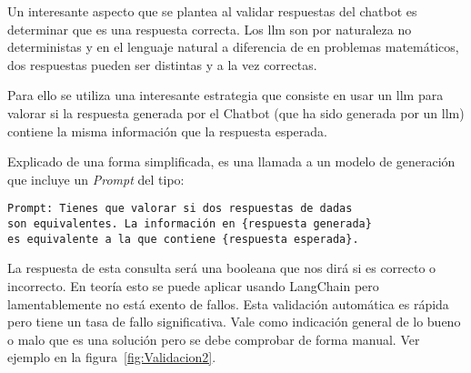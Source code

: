 Un interesante aspecto que se plantea al validar respuestas del chatbot es determinar que es una respuesta correcta. Los \acrshort{llm} son por naturaleza no deterministas y en el lenguaje natural a diferencia de en problemas matemáticos, dos respuestas pueden ser distintas y a la vez correctas. 

Para ello se utiliza una interesante estrategia que consiste en usar un \acrshort{llm} para valorar si la respuesta generada por el Chatbot (que ha sido generada por un \acrshort{llm}) contiene la misma información que la respuesta esperada.

Explicado de una forma simplificada, es una llamada a un modelo de generación que incluye un \textit{Prompt} del tipo:

\begin{verbatim}
Prompt: Tienes que valorar si dos respuestas de dadas 
son equivalentes. La información en {respuesta generada} 
es equivalente a la que contiene {respuesta esperada}.
\end{verbatim}

La respuesta de esta consulta será una booleana que nos dirá si es correcto o incorrecto. En teoría esto se puede aplicar usando LangChain pero lamentablemente no está exento de fallos. Esta validación automática es rápida pero tiene un tasa de fallo significativa. Vale como indicación general de lo bueno o malo que es una solución pero se debe comprobar de forma manual. Ver ejemplo en la figura~\ref{fig:Validacion2}.

